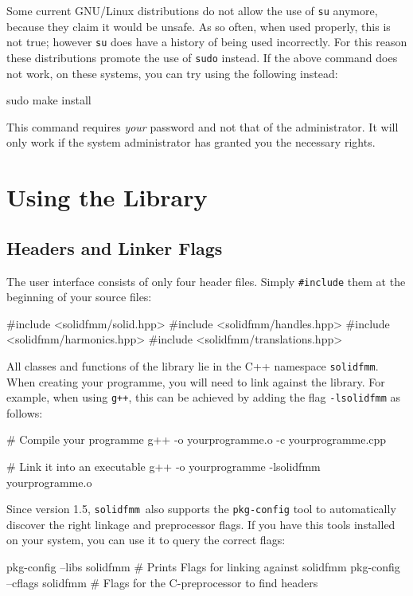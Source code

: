 \documentclass{scrbook}
\newcommand{\solidfmm}{\texttt{solidfmm}}
\begin{document}
Some current GNU/Linux distributions do not allow the use of \lstinline|su|
anymore, because they claim it would be unsafe. As so often, when used properly,
this is not true; however \lstinline|su| does have a history of being used
incorrectly. For this reason these distributions promote the use of
\lstinline|sudo| instead. If the above command does not work, on these systems,
you can try using the following instead:
\begin{commandshell*}
sudo make install
\end{commandshell*}
This command requires \emph{your} password and not that of the administrator. It
will only work if the system administrator has granted you the necessary rights.


\section{Using the Library}

\subsection{Headers and Linker Flags}
The user interface consists of only four header files. Simply
\lstinline|#include| them at the beginning of your source files:
\begin{cppcode*}
#include <solidfmm/solid.hpp>
#include <solidfmm/handles.hpp>
#include <solidfmm/harmonics.hpp>
#include <solidfmm/translations.hpp>
\end{cppcode*}

All classes and functions of the library lie in the C++ namespace
\lstinline|solidfmm|. When creating your programme, you will need to link
against the library. For example, when using \lstinline|g++|, this can be
achieved by adding the flag \lstinline|-lsolidfmm| as follows:
\begin{commandshell*}
# Compile your programme
g++ -o yourprogramme.o -c yourprogramme.cpp

# Link it into an executable
g++ -o yourprogramme -lsolidfmm yourprogramme.o
\end{commandshell*}

Since version 1.5, \solidfmm\ also supports the \lstinline|pkg-config| tool
to automatically discover the right linkage and preprocessor flags. If you have
this tools installed on your system, you can use it to query the correct flags:
\begin{commandshell*}
pkg-config --libs   solidfmm   # Prints Flags for linking against solidfmm
pkg-config --cflags solidfmm   # Flags for the C-preprocessor to find headers
\end{commandshell*}
\end{document}
